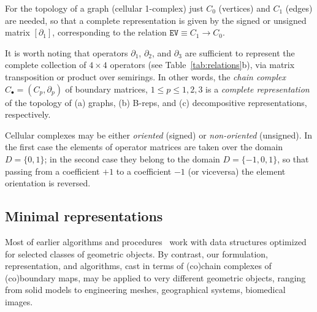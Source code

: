 For the topology of a graph (cellular 1-complex) just $C_0$ (vertices) and $C_1$ (edges) are needed, so that a complete representation is given by the signed or unsigned matrix $[\partial_1]$, corresponding to the relation $\texttt{EV} \equiv C_1\to C_0$.

It is worth noting that operators $\partial_1$, $\partial_2$, and $\partial_3$ are sufficient to represent the complete collection of $4\times 4$ operators (see Table~\ref{tab:relations}b), via matrix transposition or product over semirings. In other words, the \emph{chain complex} $C_\bullet = (C_p, \partial_p)$ of boundary matrices, $1\leq p\leq 1,2,3$ is a \emph{complete representation} of the topology of (a) graphs, (b) B-reps, and (c) decompositive representations, respectively. 

Cellular complexes may be either \emph{oriented} (signed) or \emph{non-oriented} (unsigned). In the first case the elements of operator matrices are taken over the domain $D=\{0,1\}$; in the second case they belong to the domain $D=\{-1,0,1\}$, so that passing from a coefficient $+1$ to a coefficient $-1$ (or viceversa) the element orientation is reversed.


\subsection{Minimal representations}\label{minimal-reps}

Most of earlier algorithms and procedures~\cite{
4055948,
Ala:1992:PAB:616022.617736,
Baumgart:1972:WEP:891970,
bowyer1995introducing,
bowyer1995svlis,
Braid:1975:SSB:360715.360727,
Brisson:1989:RGS:73833.73858,
cadanda,
Dobkin:1987:PMT:41958.41967,
Gomes:1999:MMB:304012.304039,
Guibas:1985:PMG:282918.282923,
HoffmannK01,
ieee-tase,
Kalay:1989:HET:63718.63719,
Lee:2001:PES:376957.376976,
Lienhardt:1991:TMB:115604.115610,
Mantyla:1988:ISM:60949,
Paoluzzi:1989:BAO:70248.70249,
Paoluzzi:1993:DMS:169728.169719,
Paoluzzi:1995:GPP:212332.212349,
Pascucci:1995:DCB:218013.218055,
Pratt94ashape,
Raghothama:1999:CUD:304012.304019,
Rap97,
Requicha:1980:RRS:356827.356833,
RequichaVoelcker:77,
Rossignac:1991:CNG:115604.115606,
Rossignac:SGC:90,
Shapiro:1991:RSS:124951,
Shapiro:1995:PFS:218013.218029,
Silva:81,
Weiler:86,
Weiler:88,
Woo:85,
wozny1990geometric,
Yamaguchi:85,
yamaguchi1995ntb,
Zhou:2016:MAS:2897824.2925901,
bieri:95,
Rossignac:89,
Hoffmann:91,
Hoffmann:1989:GSM:74803,
Hoffmann:1987:RSO:866286} 
work with data
structures optimized for selected classes of geometric
objects. By contrast, our formulation, representation, and algorithms, cast in
terms of (co)chain complexes of (co)boundary maps, may be
applied to very different geometric objects, ranging from solid models
to engineering meshes, geographical systems, biomedical images.

